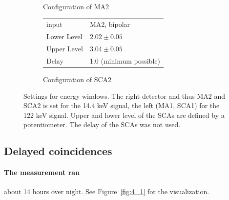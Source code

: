 \begin{figure}[h]
\begin{subfigure}[b]{0.4\linewidth}
        \caption{Configuration of MA2}
    \end{subfigure} \qquad
    \begin{subfigure}[b]{0.4\linewidth}
        \begin{tabular}{|l|l|}
            \hline
            input           & MA2, bipolar \\ 
            Lower Level     & $2.02\pm0.05$ \\
            Upper Level     & $3.04\pm0.05$ \\
            Delay           & 1.0 (minimum possible) \\
            \hline
        \end{tabular}
        \caption{Configuration of SCA2}
    \end{subfigure}
    \caption{
        Settings for energy windows. The right detector and thus MA2 and SCA2 is set for the 14.4 keV signal, 
        the left (MA1, SCA1) for the 122 keV signal. Upper and lower level of the SCAs are defined by 
        a potentiometer. The delay of the SCAs was not used. 
        }
    \label{fig:stereo}
\end{figure}

\clearpage
\subsection{Delayed coincidences}
\paragraph{The measurement ran} about 14 hours over night. See Figure~\ref{fig:4_1} for the visualization.
\label{ssub:Conduction of the experiment over night}

